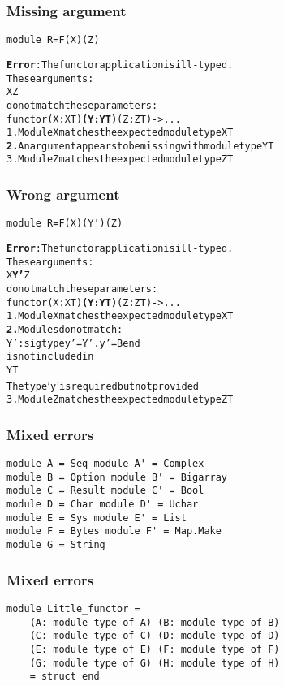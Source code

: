 \documentclass[a4paper,11pt]{beamer}
\begin{document}
\begin{frame}[fragile]\frametitle{Missing argument}
\begin{verbatim}
module R=F(X)(Z)
\end{verbatim}
\begin{alltt}
{\bfseries{}\color{red}{}Error}: The functor application is ill-typed.
       These arguments:
         {\color{green}{}X} {\color{red}{}\bfseries{}} {\color{green}{}Z}
       do not match these parameters:
         functor {\color{green}{}(X : XT)} {\color{red}{}\bfseries{}(Y : YT)} {\color{green}{}(Z : ZT)} -> ...
  {\color{green}{}1.} Module X matches the expected module type XT
  {\color{red}{}\bfseries{}2.} An argument appears to be missing with module type YT
  {\color{green}{}3.} Module Z matches the expected module type ZT
\end{alltt}
\end{frame}

\begin{frame}[fragile]\frametitle{Wrong argument}
\begin{verbatim}
module R=F(X)(Y')(Z)
\end{verbatim}
\begin{alltt}
{\bfseries{}\color{red}{}Error}: The functor application is ill-typed.
       These arguments:
         {\color{green}{}X} {\color{magenta}{}\bfseries{}Y'} {\color{green}{}Z}
       do not match these parameters:
         functor {\color{green}{}(X : XT)} {\color{magenta}{}\bfseries{}(Y : YT)} {\color{green}{}(Z : ZT)} -> ...
  {\color{green}{}1.} Module X matches the expected module type XT
  {\color{magenta}{}\bfseries{}2.} Modules do not match:
       Y' : sig type y' = Y'.y' = B end
     is not included in
       YT
     The type `y' is required but not provided
  {\color{green}{}3.} Module Z matches the expected module type ZT
\end{alltt}
\end{frame}

\begin{frame}[fragile]\frametitle{Mixed errors}
\begin{verbatim}
module A = Seq module A' = Complex
module B = Option module B' = Bigarray
module C = Result module C' = Bool
module D = Char module D' = Uchar
module E = Sys module E' = List
module F = Bytes module F' = Map.Make
module G = String
\end{verbatim}
\end{frame}
\begin{frame}[fragile]\frametitle{Mixed errors}
\begin{verbatim}
module Little_functor =
    (A: module type of A) (B: module type of B)
    (C: module type of C) (D: module type of D)
    (E: module type of E) (F: module type of F)
    (G: module type of G) (H: module type of H)
    = struct end
\end{verbatim}
\end{frame}
\end{document}
